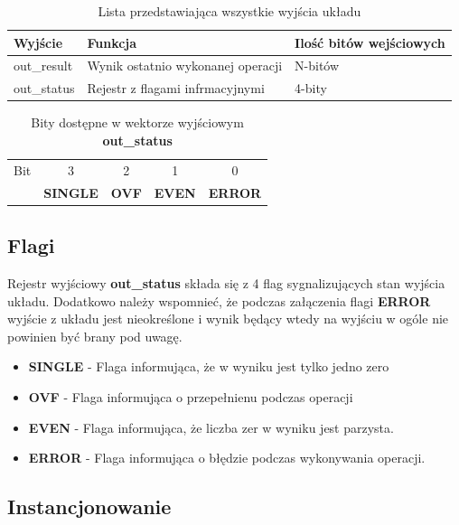 \documentclass[12pt]{article}
\begin{document}
	\begin{table}[!ht]
		\centering
		\begin{tabular}{|l|l|l|}
			\hline
			\textbf{Wyjście} & \textbf{Funkcja} & \textbf{Ilość bitów wejściowych} \\ \hline
			out\_result & Wynik ostatnio wykonanej operacji & N-bitów \\ \hline
			out\_status & Rejestr z flagami infrmacyjnymi & 4-bity \\ \hline
		\end{tabular}
		\caption{Lista przedstawiająca wszystkie wyjścia układu}
		\label{table:outputs}
		\vspace{10pt}
	\end{table}
	
	\begin{table}[!ht]
		\centering
		\begin{tabular}{l|l|l|l|l|}
			\multicolumn{1}{c}{Bit} & \multicolumn{1}{c}{3} & \multicolumn{1}{c}{2} & \multicolumn{1}{c}{1} & \multicolumn{1}{c}{0} \\ \cline{2-5}
			~ & \textbf{SINGLE} & \textbf{OVF} & \textbf{EVEN} & \textbf{ERROR} \\ \cline{2-5}
		\end{tabular}
		\caption{Bity dostępne w wektorze wyjściowym \textbf{out\_status}}
		\label{table:outstatus_bits}
	\end{table}
	
	\subsection*{Flagi}
		Rejestr wyjściowy \textbf{out\_status} składa się z 4 flag sygnalizujących stan wyjścia układu. Dodatkowo należy wspomnieć, że podczas załączenia flagi \textbf{ERROR} wyjście z układu jest nieokreślone i wynik będący wtedy na wyjściu w ogóle nie powinien być brany pod uwagę. 
		\begin{itemize}
			\item \textbf{SINGLE} - Flaga informująca, że w wyniku jest tylko jedno zero
			\item  \textbf{OVF} - Flaga informująca o przepełnienu podczas operacji
			\item  \textbf{EVEN} - Flaga informująca, że liczba zer w wyniku jest parzysta.
			\item \textbf{ERROR} - Flaga informująca o błędzie podczas wykonywania operacji.
		\end{itemize}
	
\subsection*{Instancjonowanie}
\end{document}
